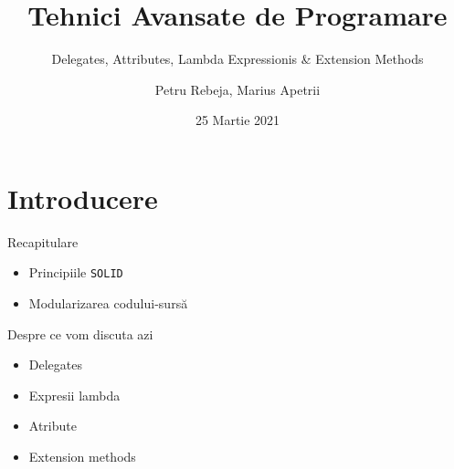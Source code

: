 \documentclass[presentation]{beamer}
\author{Petru Rebeja, Marius Apetrii}
\date{25 Martie 2021}
\title{Tehnici Avansate de Programare}
\subtitle{Delegates,  Attributes, Lambda Expressionis \& Extension Methods}
\institute[UAIC]{Facultatea de Matematică\\Universitatea Alexandru Ioan Cuza, Iași}
\begin{document}
\maketitle
\section{Introducere}
\label{sec:orgd5142ce}
\begin{frame}[label={sec:orgbed90b8},fragile]{Recapitulare}
 \begin{itemize}
\item Principiile \texttt{SOLID}
\item Modularizarea codului-sursă
\end{itemize}
\end{frame}
\begin{frame}[label={sec:orgc738f40}]{Despre ce vom discuta azi}
\begin{itemize}
\item Delegates
\item Expresii lambda
\item Atribute
\item Extension methods
\end{itemize}
\end{frame}
\end{document}

